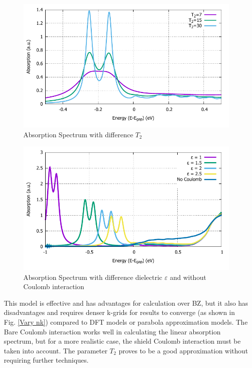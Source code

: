 \documentclass[12pt,english,a4paper]{article}
\begin{document}
\begin{figure}
	\begin{center}
		\includegraphics[width=0.75\linewidth]{images/varyT2.pdf}
		\caption[Absorption Spectrum with difference $T_2$]{Absorption Spectrum with difference $T_2$}
		\label{Vary T2}
	\end{center}
\end{figure}\null
\begin{figure}
	\begin{center}
		\includegraphics[width=0.75\linewidth]{images/varyepsilon.pdf}
		\caption[Absorption Spectrum with difference dielectric $\varepsilon$ and without Coulomb interaction]{Absorption Spectrum with difference dielectric $\varepsilon$ and without Coulomb interaction}
		\label{Vary e}
	\end{center}
\end{figure}\null
\quad This model is effective and has advantages for calculation over BZ, but it also has disadvantages and requires denser k-grids for results to converge (as shown in Fig. \ref{Vary nk}) compared to DFT models or parabola approximation models. The Bare Coulomb interaction works well in calculating the linear absorption spectrum, but for a more realistic case, the shield Coulomb interaction must be taken into account\cite{erben_excitation-induced_2018,erben_optical_2022}. The parameter $T_2$ proves to be a good approximation without requiring further techniques.
\end{document}
